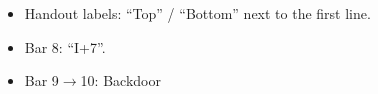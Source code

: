 
\begin{itemize}
\item Handout labels: ``Top'' / ``Bottom'' next to the first line.
\item Bar 8: ``I+7''.
\item Bar 9$\rightarrow$10: Backdoor
\end{itemize}
